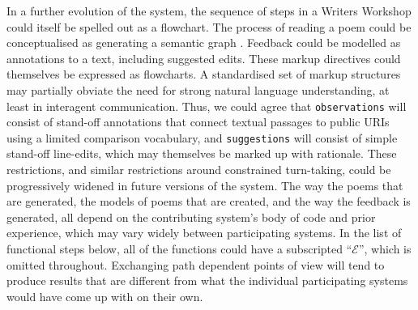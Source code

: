 In a further evolution of the system, the sequence of steps in a
Writers Workshop could itself be spelled out as a flowchart.  The
process of reading a poem could be conceptualised as generating a
semantic graph  \cite{harrington2007asknet,francisco2006automated}.  Feedback could be modelled as
annotations to a text, including suggested edits.  These markup
directives could themselves be expressed as flowcharts.
A standardised set of markup structures may
partially obviate the need for strong natural language understanding, at
least in interagent communication.  Thus, we could agree that {\tt observations} will consist
of stand-off annotations that connect textual passages to public URIs using a limited
comparison vocabulary, and {\tt suggestions} will consist of simple
stand-off line-edits, which may themselves be marked up with rationale.  These
restrictions, and similar restrictions around constrained turn-taking,
could be progressively widened in future versions of the system.
%
The way the poems that are generated, the models of poems that are
created, and the way the feedback is generated, all depend on the
contributing system's body of code and prior experience, which may
vary widely between participating systems.  In the list of functional steps below, all of
the functions could have a subscripted ``$\mathcal{E}$'', which is
omitted throughout.  Exchanging path dependent points of view will tend to produce results
that are different from what the individual participating systems would
have come up with on their own.

